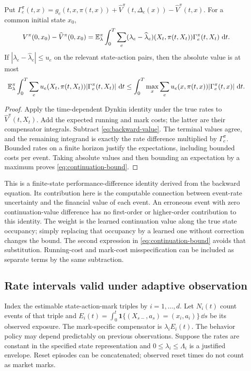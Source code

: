 \begin{theorem}\label{thm:continuation}
Put
$\Gamma_e^\pi(t,x)=g_e(t,x,\pi(t,x))+\widehat V^\pi(t,\Delta_e(x))-\widehat V^\pi(t,x)$.
For a common initial state $x_0$,
\begin{equation}\label{eq:continuation-identity}
 V^\pi(0,x_0)-\widehat V^\pi(0,x_0)
 =\mathbb E_\lambda^\pi\int_0^T\sum_e
 (\lambda_e-\widehat\lambda_e)(X_t,\pi(t,X_t))
 \Gamma_e^\pi(t,X_t)\,\,\mathrm d t.
\end{equation}
If $|\lambda_e-\widehat\lambda_e|\le u_e$ on the relevant state-action pairs, then the absolute value is at most
\begin{equation}\label{eq:continuation-bound}
 \mathbb E_\lambda^\pi\int_0^T\sum_eu_e(X_t,\pi(t,X_t))
 |\Gamma_e^\pi(t,X_t)|\,\,\mathrm d t
 \le\int_0^T\max_x\sum_eu_e(x,\pi(t,x))|\Gamma_e^\pi(t,x)|\,\,\mathrm d t.
\end{equation}
\end{theorem}
\begin{proof}
Apply the time-dependent Dynkin identity under the true rates to $\widehat V^\pi(t,X_t)$. Add the expected running and mark costs; the latter are their compensator integrals. Subtract \eqref{eq:backward-value}. The terminal values agree, and the remaining integrand is exactly the rate difference multiplied by $\Gamma_e^\pi$. Bounded rates on a finite horizon justify the expectations, including bounded costs per event. Taking absolute values and then bounding an expectation by a maximum proves \eqref{eq:continuation-bound}.
\end{proof}

This is a finite-state performance-difference identity derived from the backward equation. Its contribution here is the computable connection between event-rate uncertainty and the financial value of each event. An erroneous event with zero continuation-value difference has no first-order or higher-order contribution to this identity. The weight is the learned continuation value along the true state occupancy; simply replacing that occupancy by a learned one without correction changes the bound. The second expression in \eqref{eq:continuation-bound} avoids that substitution. Running-cost and mark-cost misspecification can be included as separate terms by the same subtraction.

\subsection{Rate intervals valid under adaptive observation}
Index the estimable state-action-mark triples by $i=1,\ldots,d$. Let $N_i(t)$ count events of that triple and
$E_i(t)=\int_0^t\mathbf1\{(X_{s-},a_s)=(x_i,a_i)\}\,\dd s$
be its observed exposure. The mark-specific compensator is $\lambda_iE_i(t)$. The behavior policy may depend predictably on previous observations. Suppose the rates are constant in the specified state representation and $0\le\lambda_i\le\Lambda_i$ is a justified envelope. Reset episodes can be concatenated; observed reset times do not count as market marks.


